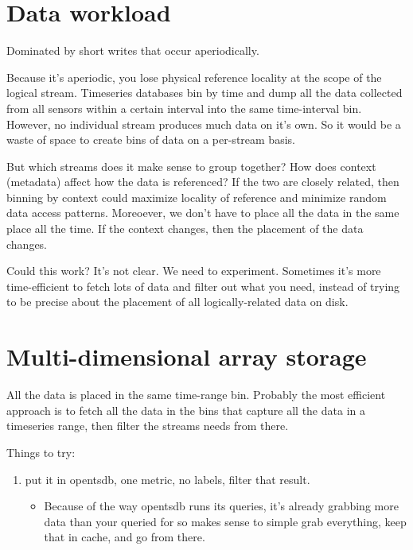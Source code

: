 \section{Data workload}
Dominated by short writes that occur aperiodically.

Because it's aperiodic, you lose physical reference locality at the scope of the logical stream.  Timeseries databases bin by time
and dump all the data collected from all sensors within a certain interval into the same time-interval bin.
However, no individual stream produces much data on it's own.  So it would be a waste of space to create bins of data on a per-stream
basis.

But which streams does it make sense to group together?  How does context (metadata) affect how the data is referenced?  If the two are
closely related, then binning by context could maximize locality of reference and minimize random data access patterns.
Moreoever, we don't have to place all the data in the same place all the time.  If the context changes, then the placement of the data changes.

Could this work?  It's not clear.  We need to experiment.  Sometimes it's more time-efficient to fetch lots of data and filter out what you
need, instead of trying to be precise about the placement of all logically-related data on disk.



\section{Multi-dimensional array storage}
All the data is placed in the same time-range bin.  Probably the most efficient approach is to fetch all the data in the bins 
that capture all the data in a timeseries range, then filter the streams needs from there.

Things to try:
\begin{enumerate}
\item put it in opentsdb, one metric, no labels, filter that result.
	\begin{itemize}
	\item Because of the way opentsdb runs its queries, it's already grabbing more data than your queried for
			so makes sense to simple grab everything, keep that in cache, and go from there.
	\end{itemize}
\end{enumerate}